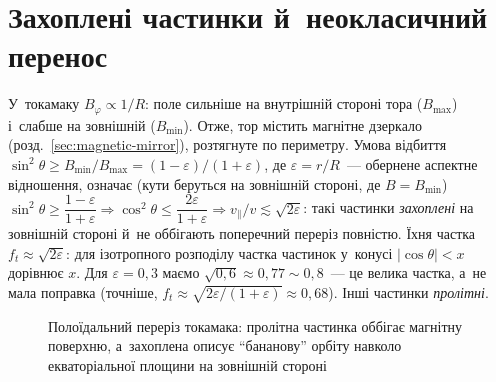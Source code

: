 \section{Захоплені частинки й~неокласичний перенос}\label{sec:neoclassical}

У~токамаку $B_\varphi\propto1/R$: поле сильніше на внутрішній стороні тора ($B_{\max}$) і~слабше
на зовнішній ($B_{\min}$). Отже, тор містить магнітне дзеркало (розд.~\ref{sec:magnetic-mirror}), розтягнуте по
периметру. Умова відбиття $\sin^2\theta\ge B_{\min}/B_{\max}=(1-\varepsilon)/(1+\varepsilon)$, де
$\varepsilon=r/R$~--- обернене аспектне відношення, означає (кути беруться на зовнішній стороні, де $B=B_{\min}$)
$\sin^2\theta\ge\dfrac{1-\varepsilon}{1+\varepsilon}\Rightarrow\cos^2\theta\le\dfrac{2\varepsilon}{1+\varepsilon}\Rightarrow
v_\parallel/v\lesssim\sqrt{2\varepsilon}$: такі частинки \emph{захоплені} на зовнішній стороні й~не оббігають
поперечний переріз повністю. Їхня частка $f_t\approx\sqrt{2\varepsilon}$: для ізотропного розподілу частка
частинок у~конусі $|\cos\theta|<x$ дорівнює $x$. Для $\varepsilon=0{,}3$ маємо $\sqrt{0{,}6}\approx0{,}77\sim0{,}8$~---
це велика частка, а~не мала поправка (точніше, $f_t\approx\sqrt{2\varepsilon/(1+\varepsilon)}\approx0{,}68$). Інші частинки \emph{пролітні}.

\begin{figure}[ht]\centering
	\caption{Полоїдальний переріз токамака: пролітна частинка оббігає магнітну поверхню, а~захоплена
	описує \enquote{бананову} орбіту навколо екваторіальної площини на зовнішній стороні}
	\label{pic:banana}
\end{figure}

